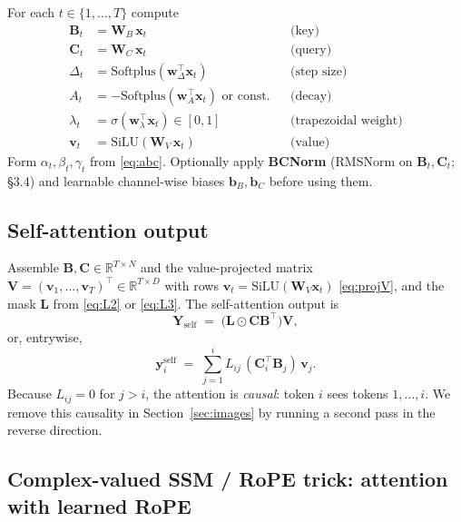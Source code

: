 \documentclass[11pt,a4paper]{article}
\begin{document}
For each $t\in\{1,\dots,T\}$ compute
\begin{align}
  \bm{B}_t &= \bm{W}_B\,\bm{x}_t        & &\text{(key)} \\
  \bm{C}_t &= \bm{W}_C\,\bm{x}_t        & &\text{(query)} \\
  \Delta_t &= \mathrm{Softplus}(\bm{w}_\Delta^\top\bm{x}_t) & &\text{(step size)}\\
  A_t &= -\mathrm{Softplus}(\bm{w}_A^\top\bm{x}_t) \text{ or const.} & &\text{(decay)} \\
  \lambda_t &= \sigma(\bm{w}_\lambda^\top\bm{x}_t)\in[0,1] & &\text{(trapezoidal weight)} \\
  \bm{v}_t &= \mathrm{SiLU}(\bm{W}_V\,\bm{x}_t)         & &\text{(value)}
\end{align}
Form $\alpha_t,\beta_t,\gamma_t$ from \eqref{eq:abc}. Optionally apply
\textbf{BCNorm} (RMSNorm on $\bm{B}_t,\bm{C}_t$; \cite{mamba3}
\S 3.4) and learnable channel-wise biases $\bm{b}_B, \bm{b}_C$ before
using them.

\subsection{Self-attention output}

Assemble $\bm{B},\bm{C}\in\mathbb{R}^{T\times N}$ and the
value-projected matrix
$\bm{V} = (\bm{v}_1,\dots,\bm{v}_T)^\top\in\mathbb{R}^{T\times D}$
with rows $\bm{v}_t = \mathrm{SiLU}(\bm{W}_V\bm{x}_t)$
\eqref{eq:projV}, and the mask
$\bm{L}$ from \eqref{eq:L2} or \eqref{eq:L3}. The self-attention
output is
\begin{equation}\label{eq:self-out}
  \bm{Y}_{\text{self}} \;=\; \bigl(\bm{L}\odot\bm{C}\bm{B}^\top\bigr)\bm{V},
\end{equation}
or, entrywise,
\begin{equation}\label{eq:self-entry}
  \bm{y}_i^{\text{self}} \;=\; \sum_{j=1}^{i} L_{ij}\,(\bm{C}_i^\top \bm{B}_j)\,\bm{v}_j.
\end{equation}
Because $L_{ij}=0$ for $j>i$, the attention is \emph{causal}: token
$i$ sees tokens $1,\dots,i$. We remove this causality in
Section~\ref{sec:images} by running a second pass in the reverse
direction.

\subsection{Complex-valued SSM / RoPE trick: attention with learned RoPE}
\label{sec:rope}
\end{document}
